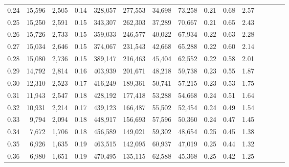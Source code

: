 \begin{tabular}{rrrcrrrrrrrrrrr}
0.24 &  15,596 &  2,505 &                                       0.14 &  328,057 &  277,553 &   34,698 &   73,258 &  0.21 &  0.68 &                         2.57 \\
0.25 &  15,250 &  2,591 &                                       0.15 &  343,307 &  262,303 &   37,289 &   70,667 &  0.21 &  0.65 &                         2.43 \\
0.26 &  15,726 &  2,733 &                                       0.15 &  359,033 &  246,577 &   40,022 &   67,934 &  0.22 &  0.63 &                         2.28 \\
0.27 &  15,034 &  2,646 &                                       0.15 &  374,067 &  231,543 &   42,668 &   65,288 &  0.22 &  0.60 &                         2.14 \\
0.28 &  15,080 &  2,736 &                                       0.15 &  389,147 &  216,463 &   45,404 &   62,552 &  0.22 &  0.58 &                         2.01 \\
0.29 &  14,792 &  2,814 &                                       0.16 &  403,939 &  201,671 &   48,218 &   59,738 &  0.23 &  0.55 &                         1.87 \\
0.30 &  12,310 &  2,523 &                                       0.17 &  416,249 &  189,361 &   50,741 &   57,215 &  0.23 &  0.53 &                         1.75 \\
0.31 &  11,943 &  2,547 &                                       0.18 &  428,192 &  177,418 &   53,288 &   54,668 &  0.24 &  0.51 &                         1.64 \\
0.32 &  10,931 &  2,214 &                                       0.17 &  439,123 &  166,487 &   55,502 &   52,454 &  0.24 &  0.49 &                         1.54 \\
0.33 &   9,794 &  2,094 &                                       0.18 &  448,917 &  156,693 &   57,596 &   50,360 &  0.24 &  0.47 &                         1.45 \\
0.34 &   7,672 &  1,706 &                                       0.18 &  456,589 &  149,021 &   59,302 &   48,654 &  0.25 &  0.45 &                         1.38 \\
0.35 &   6,926 &  1,635 &                                       0.19 &  463,515 &  142,095 &   60,937 &   47,019 &  0.25 &  0.44 &                         1.32 \\
0.36 &   6,980 &  1,651 &                                       0.19 &  470,495 &  135,115 &   62,588 &   45,368 &  0.25 &  0.42 &                         1.25 \\

\end{tabular}
